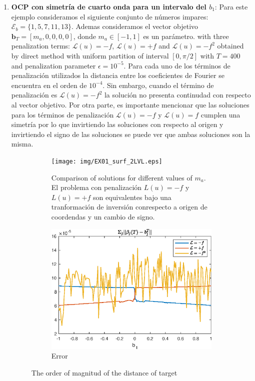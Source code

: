 \begin{enumerate}
    \item \textbf{OCP con simetría de cuarto onda para un intervalo del $b_1$}: Para este ejemplo consideramos el siguiente conjunto de números impares: $\mathcal{E}_b = \{1,5,7,11,13\}$. 
    Ademas consideramos el vector objetivo $\bm{b}_T = [m_a,0,0,0,0]$, donde  $m_a \in [-1,1]$ es un parámetro. with three penalization terms: $\mathcal{L}(u) = -f$, $\mathcal{L}(u) = +f$ and $\mathcal{L}(u) = -f^2$ obtained by direct method with uniform partition of interval $[0,\pi/2]$ with $T=400$ and penalization parameter $\epsilon = 10^{-5}$. 
    Para cada uno de los términos de penalización utilizados la distancia entre los coeficientes de Fourier se encuentra en el orden de $10^{-4}$. 
    Sin embargo, cuando el término de penalización es $\mathcal{L}(u)= -f^2$ la solución no presenta continudad con respecto al vector objetivo. 
    Por otra parte, es importante mencionar que las soluciones para los términos de penalización $\mathcal{L}(u) = -f$ y $\mathcal{L}(u) = f$ cumplen una simetría por lo que invirtiendo las soluciones con respecto al origen y invirtiendo el signo de las soluciones se puede ver que ambas soluciones son la misma.

    \begin{figure}
        \centering
        \begin{subfigure}[b]{\textwidth}
            \centering
            \texttt{[image: img/EX01\_surf\_2LVL.eps]}
            \caption{Comparison of solutions for different values of $m_a$. El problema con penalización $L(u) = -f$ y $L(u) = +f$ son equivalentes bajo una tranformación de inversión conrespecto a origen de coordendas y un cambio de signo.}
        \end{subfigure} 
        \hfill 
        \begin{subfigure}[b]{0.6\textwidth}
            \centering
            \includegraphics[scale=0.6]{img/EX01_2LVL.eps}
            \caption{Error}
        \end{subfigure}
        \caption{The order of magnitud of the distance of target}
        \label{ex01}
    \end{figure}



\end{enumerate}
